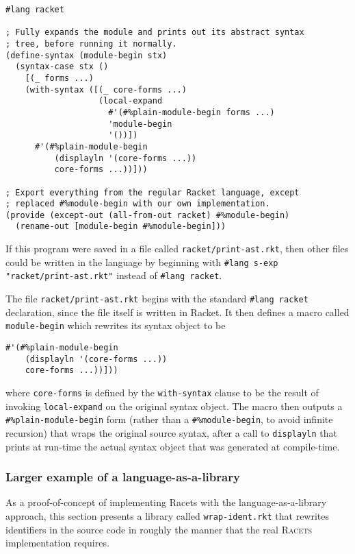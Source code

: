 \documentclass{article}
\begin{document}
\begin{lstlisting}
#lang racket

; Fully expands the module and prints out its abstract syntax
; tree, before running it normally.
(define-syntax (module-begin stx)
  (syntax-case stx ()
    [(_ forms ...)
    (with-syntax ([(_ core-forms ...)
                   (local-expand
                     #'(#%plain-module-begin forms ...)
                     'module-begin
                     '())])
      #'(#%plain-module-begin
          (displayln '(core-forms ...))
          core-forms ...))]))

; Export everything from the regular Racket language, except
; replaced #%module-begin with our own implementation.
(provide (except-out (all-from-out racket) #%module-begin)
  (rename-out [module-begin #%module-begin]))
\end{lstlisting}

If this program were saved in a file called \texttt{racket/print-ast.rkt}, then other files could be written in the language by beginning with \texttt{\#lang s-exp "racket/print-ast.rkt"} instead of \texttt{\#lang racket}.

The file \texttt{racket/print-ast.rkt} begins with the standard \texttt{\#lang racket} declaration, since the file itself is written in Racket. It then defines a macro called \texttt{module-begin} which rewrites its syntax object to be

\begin{lstlisting}
#'(#%plain-module-begin
    (displayln '(core-forms ...))
    core-forms ...))]))
\end{lstlisting}

where \texttt{core-forms} is defined by the \texttt{with-syntax} clause to be the result of invoking \texttt{local-expand} on the original syntax object. The macro then outputs a \texttt{\#\%plain-module-begin} form (rather than a \texttt{\#\%module-begin}, to avoid infinite recursion) that wraps the original source syntax, after a call to \texttt{displayln} that prints at run-time the actual syntax object that was generated at compile-time.


\subsubsection{Larger example of a language-as-a-library}
As a proof-of-concept of implementing Racets with the language-as-a-library approach, this section presents a library called \texttt{wrap-ident.rkt} that rewrites identifiers in the source code in roughly the manner that the real \textsc{Racets} implementation requires.
\end{document}
